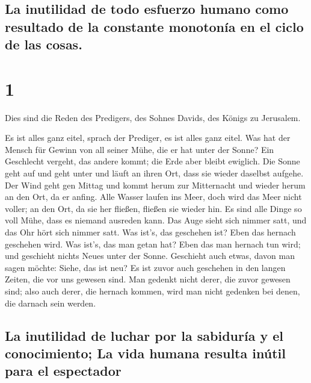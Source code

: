 \hypertarget{la-inutilidad-de-todo-esfuerzo-humano-como-resultado-de-la-constante-monotonuxeda-en-el-ciclo-de-las-cosas.}{%
\subsection{La inutilidad de todo esfuerzo humano como resultado de la
constante monotonía en el ciclo de las
cosas.}\label{la-inutilidad-de-todo-esfuerzo-humano-como-resultado-de-la-constante-monotonuxeda-en-el-ciclo-de-las-cosas.}}

\hypertarget{section}{%
\section{1}\label{section}}

 Dies sind die Reden des Predigers, des Sohnes Davids, des
Königs zu Jerusalem.

 Es ist alles ganz eitel, sprach der Prediger, es ist
alles ganz eitel.  Was hat der Mensch für Gewinn von all
seiner Mühe, die er hat unter der Sonne?  Ein Geschlecht
vergeht, das andere kommt; die Erde aber bleibt ewiglich. 
Die Sonne geht auf und geht unter und läuft an ihren Ort, dass sie
wieder daselbst aufgehe.  Der Wind geht gen Mittag und
kommt herum zur Mitternacht und wieder herum an den Ort, da er anfing.
 Alle Wasser laufen ins Meer, doch wird das Meer nicht
voller; an den Ort, da sie her fließen, fließen sie wieder hin.
 Es sind alle Dinge so voll Mühe, dass es niemand ausreden
kann. Das Auge sieht sich nimmer satt, und das Ohr hört sich nimmer
satt.  Was ist's, das geschehen ist? Eben das hernach
geschehen wird. Was ist's, das man getan hat? Eben das man hernach tun
wird; und geschieht nichts Neues unter der Sonne. 
Geschieht auch etwas, davon man sagen möchte: Siehe, das ist neu? Es ist
zuvor auch geschehen in den langen Zeiten, die vor uns gewesen sind.
 Man gedenkt nicht derer, die zuvor gewesen sind; also
auch derer, die hernach kommen, wird man nicht gedenken bei denen, die
darnach sein werden.

\hypertarget{la-inutilidad-de-luchar-por-la-sabiduruxeda-y-el-conocimiento-la-vida-humana-resulta-inuxfatil-para-el-espectador}{%
\subsection{La inutilidad de luchar por la sabiduría y el conocimiento;
La vida humana resulta inútil para el
espectador}\label{la-inutilidad-de-luchar-por-la-sabiduruxeda-y-el-conocimiento-la-vida-humana-resulta-inuxfatil-para-el-espectador}}

